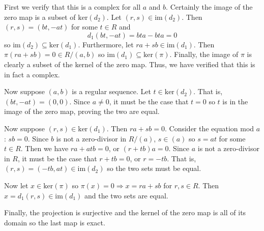 \documentclass[../../master.tex]{subfiles}
\begin{document}
\begin{solution}
    First we verify that this is a complex for all $a$ and $b$.
    Certainly the image of the zero map is a subset of $\text{ker}(d_2)$.
    Let $(r, s) \in \text{im}(d_2)$.
    Then $(r, s) = (bt, -at)$ for some $t \in R$ and
    \[
        d_1(bt, -at) = bta - bta = 0
    \]
    so $\text{im}(d_2) \subseteq \text{ker}(d_1)$.
    Furthermore, let $ra + sb \in \text{im}(d_1)$.
    Then $\pi(ra + sb) = 0 \in R / (a, b)$ so $\text{im}(d_1) \subseteq \text{ker}(\pi)$.
    Finally, the image of $\pi$ is clearly a subset of the kernel of the zero map.
    Thus, we have verified that this is in fact a complex.

    Now suppose $(a, b)$ is a regular sequence.
    Let $t \in \text{ker}(d_2)$.
    That is, $(bt, -at) = (0, 0)$.
    Since $a \neq 0$, it must be the case that $t = 0$ so $t$ is in the image of the zero map, proving the two are equal.

    Now suppose $(r, s) \in \text{ker}(d_1)$.
    Then $ra + sb = 0$.
    Consider the equation mod $a$: $sb = 0$.
    Since $b$ is not a zero-divisor in $R / (a)$, $s \in (a)$ so $s = at$ for some $t \in R$.
    Then we have $ra + atb = 0$, or $(r + tb)a = 0$.
    Since $a$ is not a zero-divisor in $R$, it must be the case that $r + tb = 0$, or $r = -tb$.
    That is, $(r, s) = (-tb, at) \in \text{im}(d_2)$ so the two sets must be equal.

    Now let $x \in \text{ker}(\pi)$ so $\pi(x) = 0 \Longrightarrow x = ra + sb$ for $r, s \in R$.
    Then $x = d_1(r, s) \in \text{im}(d_1)$ and the two sets are equal.

    Finally, the projection is surjective and the kernel of the zero map is all of its domain so the last map is exact.
\end{solution}
\end{document}

